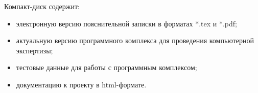  
 \newpage
 \renewcommand{\refname}{Список использованных источников}
 

 Компакт-диск содержит: 
 \begin{itemize}
 \item электронную версию пояснительной записки в форматах *.tex и *.pdf;
 \item актуальную версию программного комплекса для проведения компьютерной экспертизы;
 \item тестовые данные для работы с программным комплексом;
 \item документацию к проекту в html-формате.
 \end{itemize}
 

